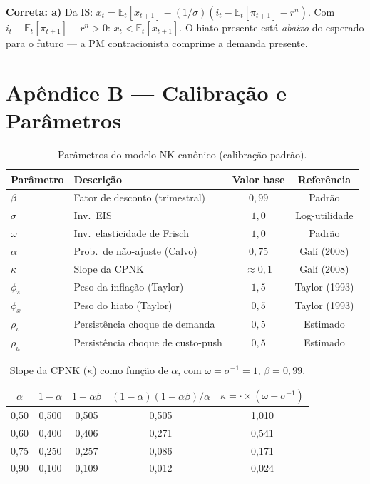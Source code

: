 \documentclass[12pt, a4paper]{article}
\newcommand{\E}{\mathbb{E}}
\begin{document}
\begin{resultbox}[title={Resposta Q-tipo 6: alternativa a)}]
\textbf{Correta: a)} Da IS: $x_t = \E_t[x_{t+1}] - (1/\sigma)(i_t - \E_t[\pi_{t+1}] - r^n)$.
Com $i_t - \E_t[\pi_{t+1}] - r^n > 0$: $x_t < \E_t[x_{t+1}]$. O hiato presente
está \emph{abaixo} do esperado para o futuro --- a PM contracionista comprime a
demanda presente.
\end{resultbox}


\section*{\color{cyanrbc} Apêndice B --- Calibração e Parâmetros}

\begin{table}[h!]
\centering
\caption{Parâmetros do modelo NK canônico (calibração padrão).}
\begin{tabular}{llcc}
\toprule
Parâmetro & Descrição & Valor base & Referência \\
\midrule
$\beta$ & Fator de desconto (trimestral) & $0{,}99$ & Padrão \\
$\sigma$ & Inv.\ EIS & $1{,}0$ & Log-utilidade \\
$\omega$ & Inv.\ elasticidade de Frisch & $1{,}0$ & Padrão \\
$\alpha$ & Prob.\ de não-ajuste (Calvo) & $0{,}75$ & Galí (2008) \\
$\kappa$ & Slope da CPNK & $\approx 0{,}1$ & Galí (2008) \\
$\phi_\pi$ & Peso da inflação (Taylor) & $1{,}5$ & Taylor (1993) \\
$\phi_x$ & Peso do hiato (Taylor) & $0{,}5$ & Taylor (1993) \\
$\rho_v$ & Persistência choque de demanda & $0{,}5$ & Estimado \\
$\rho_u$ & Persistência choque de custo-push & $0{,}5$ & Estimado \\
\bottomrule
\end{tabular}
\end{table}

\begin{table}[h!]
\centering
\caption{Slope da CPNK ($\kappa$) como função de $\alpha$, com $\omega = \sigma^{-1} = 1$, $\beta = 0{,}99$.}
\begin{tabular}{ccccc}
\toprule
$\alpha$ & $1-\alpha$ & $1-\alpha\beta$ & $(1-\alpha)(1-\alpha\beta)/\alpha$ & $\kappa = \cdot\times(\omega+\sigma^{-1})$ \\
\midrule
0,50 & 0,500 & 0,505 & 0,505 & 1,010 \\
0,60 & 0,400 & 0,406 & 0,271 & 0,541 \\
0,75 & 0,250 & 0,257 & 0,086 & 0,171 \\
0,90 & 0,100 & 0,109 & 0,012 & 0,024 \\
\bottomrule
\end{tabular}
\end{table}
\end{document}
